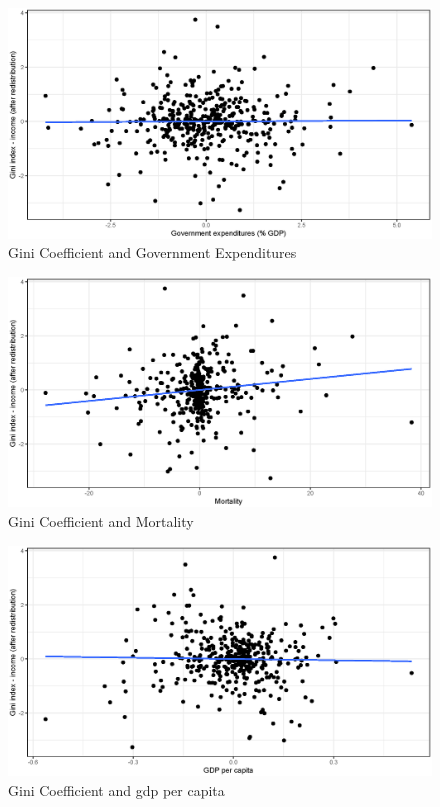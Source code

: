 \documentclass[a4paper,11pt]{article}
\begin{document}
\begin{figure}
    \caption{Gini Coefficient and Government Expenditures}
\includegraphics[width=\textwidth, keepaspectratio]{figures/GovExpGiniNet_dm}
\end{figure}

\begin{figure}
    \caption{Gini Coefficient and Mortality}
\includegraphics[width=\textwidth, keepaspectratio]{figures/MortGiniNet_dm}
\end{figure}

\begin{figure}
    \caption{Gini Coefficient and \ac{gdp} per capita}
\includegraphics[width=\textwidth, keepaspectratio]{figures/GDPGiniNet_dm}
\end{figure}
\end{document}
